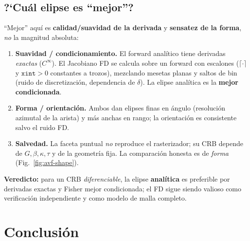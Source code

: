 \documentclass[11pt,a4paper]{article}
\theoremstyle{plain}
\theoremstyle{definition}
\begin{document}

\subsection{\textup{?`}Cu\'al elipse es ``mejor''?}
``Mejor'' aqu\'i es \textbf{calidad/suavidad de la derivada} y \textbf{sensatez de
la forma}, \emph{no} la magnitud absoluta:
\begin{enumerate}[nosep]
    \item \textbf{Suavidad / condicionamiento.} El forward anal\'itico tiene
    derivadas \emph{exactas} ($C^\infty$). El Jacobiano FD se calcula sobre un
    forward con escalones ($\lceil\cdot\rceil$ y $\texttt{xint}>0$ constantes a
    trozos), mezclando mesetas planas y saltos de bin (ruido de discretizaci\'on,
    dependencia de $\delta$). La elipse anal\'itica es la \textbf{mejor
    condicionada}.
    \item \textbf{Forma / orientaci\'on.} Ambos dan elipses finas en \'angulo
    (resoluci\'on azimutal de la arista) y m\'as anchas en rango; la orientaci\'on
    es consistente salvo el ruido FD.
    \item \textbf{Salvedad.} La faceta puntual \emph{no} reproduce el
    rasterizador; su CRB depende de $G,\beta,\kappa,\tau$ y de la geometr\'ia
    fija. La comparaci\'on honesta es de \emph{forma} (Fig.~\ref{fig:avf-shape}).
\end{enumerate}
\textbf{Veredicto:} para un CRB \emph{diferenciable}, la elipse \textbf{anal\'itica}
es preferible por derivadas exactas y Fisher mejor condicionada; el FD sigue
siendo valioso como verificaci\'on independiente y como modelo de malla completo.

\section{Conclusi\'on}
\label{sec:conclusion}
\end{document}
